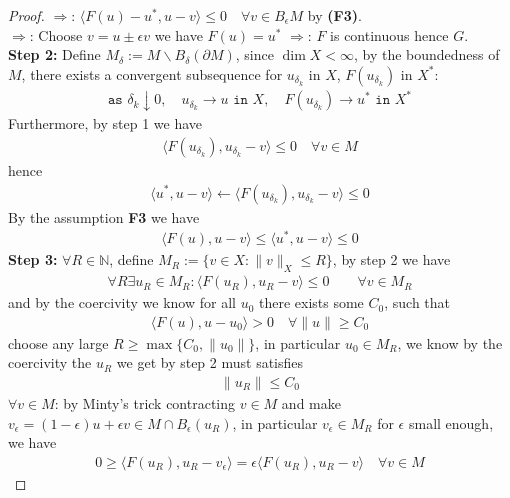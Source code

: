 \begin{proof}
$\Rightarrow$: $\langle F(u) - u^*, u - v \rangle \le 0 \quad \forall v \in B_\epsilon M$ by \textbf{(F3)}. \\
$\Rightarrow$: Choose $v = u \pm \epsilon v$ we have $F(u) = u^*$
$\Rightarrow$: $F$ is continuous hence $G$. \\
\textbf{Step 2:} Define $M_\delta := M \backslash B_\delta(\partial M)$, since $\dim X < \infty$, by the boundedness of $M$, there exists a convergent subsequence for $u_{\delta_k}$ in $X$, $F(u_{\delta_k})$ in $X^*$:
\begin{align*}
	\texttt{as }\delta_k \downarrow 0, \quad u_{\delta_k} \rightarrow u \texttt{ in } X, \quad
	F(u_{\delta_k}) \rightarrow u^* \texttt{ in } X^* 
\end{align*}
Furthermore, by step 1 we have
\begin{align*}
	\langle F(u_{\delta_k}), u_{\delta_k} - v \rangle \le 0 \quad \forall v \in M
\end{align*}
hence
\begin{align*}
	\langle u^*, u - v \rangle \leftarrow \langle F(u_{\delta_k}), u_{\delta_k} - v \rangle \le 0
\end{align*}
By the assumption \textbf{F3} we have
\begin{align*}
	\langle F(u), u - v\rangle \le \langle u^*, u - v \rangle \le 0
\end{align*}
\textbf{Step 3: }
$\forall R \in \mathbb{N}$, define $M_R:= \{ v \in X: \|v\|_X \le R\}$, by step 2 we have
\begin{align*}
	\forall R  \exists u_R \in M_R: \langle F(u_R), u_R - v \rangle \le 0 \qquad \forall v \in M_R
\end{align*}
and by the coercivity we know for all $u_0$ there exists some $C_0$, such that
\begin{align*}
	\langle F(u), u - u_0 \rangle > 0  \quad \forall \|u \| \ge C_0
\end{align*}
choose any large $R \ge \max\{C_0, \|u_0\|\}$, in particular $u_0 \in M_R$, we know by the coercivity the $u_R$ we get by step 2 must satisfies
\begin{align*}
	\|u_R\| \le C_0
\end{align*}
$\forall v \in M$: by Minty's trick contracting $v \in M$ and make  $v_\epsilon = (1 - \epsilon) u + \epsilon v \in M \cap B_\epsilon(u_R) $, in particular $v_\epsilon \in M_R$ for $\epsilon$ small enough, we have
\begin{align*}
	0 \ge \langle F(u_R), u_R - v_\epsilon \rangle = \epsilon \langle F(u_R), u_R - v \rangle \quad \forall v \in M
\end{align*} 
\end{proof}

